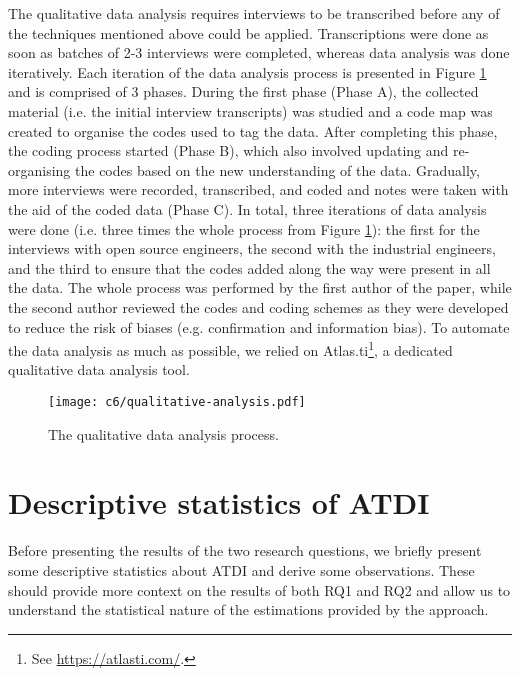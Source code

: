 The qualitative data analysis requires interviews to be transcribed before any of the techniques mentioned above could be applied.
Transcriptions were done as soon as batches of 2-3 interviews were completed, whereas data analysis was done iteratively.
Each iteration of the data analysis process is presented in Figure \ref{c6:fig:qualitative-analysis} and is comprised of 3 phases. During the first phase (Phase A), the collected material (i.e. the initial interview transcripts) was studied and a code map was created to organise the codes used to tag the data.
After completing this phase, the coding process started (Phase B), which also involved updating and re-organising the codes based on the new understanding of the data.
Gradually, more interviews were recorded, transcribed, and coded and notes were taken with the aid of the coded data (Phase C).
In total, three iterations of data analysis were done (i.e. three times the whole process from Figure \ref{c6:fig:qualitative-analysis}): the first for the interviews with open source engineers, the second with the industrial engineers, and the third to ensure that the codes added along the way were present in all the data.
The whole process was performed by the first author of the paper, while the second author reviewed the codes and coding schemes as they were developed to reduce the risk of biases (e.g. confirmation and information bias).
To automate the data analysis as much as possible, we relied on Atlas.ti\footnote{See \url{https://atlasti.com/}.}, a dedicated qualitative data analysis tool.

\begin{figure}
    \centering
    \texttt{[image: c6/qualitative-analysis.pdf]}
    \caption{The qualitative data analysis process.}
    \label{c6:fig:qualitative-analysis}
\end{figure}

\section{Descriptive statistics of ATDI}\label{c6:sec:descriptive-statistics}
Before presenting the results of the two research questions, we briefly present some descriptive statistics about ATDI and derive some observations.
These should provide more context on the results of both RQ1 and RQ2 and allow us to understand the statistical nature of the estimations provided by the approach.

